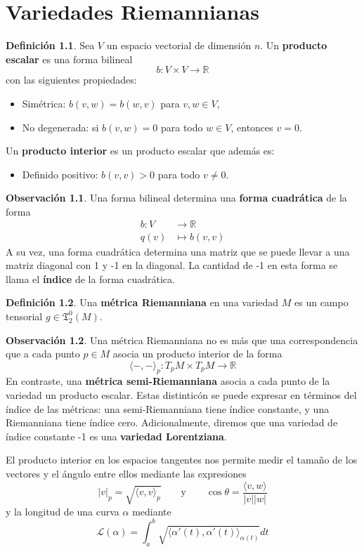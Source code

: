 \documentclass[spanish]{book}
\theoremstyle{definition}
\newtheorem*{defn}{Definición}
\newtheorem*{obs}{Observación}
\newcommand{\R}{\mathbb{R}}
\newcommand{\T}{\mathfrak{T}}
\begin{document}
	\chapter{Variedades Riemannianas}
	\begin{defn}
		Sea $V$ un espacio vectorial de dimensión $n$. Un \textbf{producto escalar} es una forma bilineal
			\[b:V\times V\to\R\]
		con las siguientes propiedades:
		\begin{itemize}
			\item Simétrica: $b(v,w)=b(w,v)$ para $v,w\in V$,
			\item No degenerada: si $b(v,w)=0$ para todo $w\in V$, entonces $v=0$.
		\end{itemize}
		Un \textbf{producto interior} es un producto escalar que además es:
		\begin{itemize}
			\item Definido positivo: $b(v,v)>0$ para todo $v\neq0$.
		\end{itemize}
	\end{defn}
	\begin{obs}
		Una forma bilineal determina una \textbf{forma cuadrática} de la forma
		\begin{align*}
			b:V&\to\R\\
			q(v)&\mapsto b(v,v)
		\end{align*}
		A su vez, una forma cuadrática determina una matriz que se puede llevar a una matriz diagonal con 1 y -1 en la diagonal. La cantidad de -1 en esta forma se llama el \textbf{índice} de la forma cuadrática.
	\end{obs}
	
	\begin{defn}
		Una \textbf{métrica Riemanniana} en una variedad $M$ es un campo tensorial $g\in\T^0_2(M)$.
	\end{defn}
	\begin{obs}
		Una métrica Riemanniana no es más que una correspondencia que a cada punto $p\in M$ asocia un producto interior de la forma
			\[\langle -,- \rangle_p:T_pM\times T_pM\to\R\]
		 En contraste, una \textbf{métrica semi-Riemanniana} asocia a cada punto de la variedad un producto escalar. Estas distinticón se puede expresar en términos del índice de las métricas: una semi-Riemanniana tiene índice constante, y una Riemanniana tiene índice cero. Adicionalmente, diremos que una variedad de índice constante -1 es una \textbf{variedad Lorentziana}.
	\end{obs}
	El producto interior en los espacios tangentes nos permite medir el tamaño de los vectores y el ángulo entre ellos mediante las expresiones
	\[|v|_p=\sqrt{\langle v,v\rangle_p}\qquad\text{y}\qquad\cos\theta=\frac{\langle v,w\rangle}{|v||w|}\]
	y la longitud de una curva $\alpha$ mediante
	\[\mathcal{L}(\alpha)=\int_a^b\sqrt{\langle\alpha'(t),\alpha'(t)\rangle_{\alpha(t)}}dt\]
	
\end{document}

